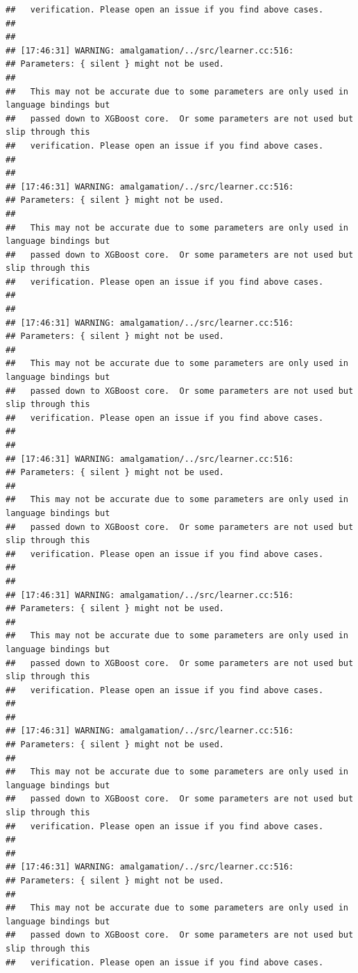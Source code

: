\documentclass[AMS,STIX2COL]{WileyNJD-v2}\usepackage[]{graphicx}\usepackage[]{color}
\makeatletter
\newenvironment{kframe}{%
 \def\at@end@of@kframe{}%
 \ifinner\ifhmode%
  \def\at@end@of@kframe{\end{minipage}}%
  \begin{minipage}{\columnwidth}%
 \fi\fi%
 \def\FrameCommand##1{\hskip\@totalleftmargin \hskip-\fboxsep
 \colorbox{shadecolor}{##1}\hskip-\fboxsep
     \hskip-\linewidth \hskip-\@totalleftmargin \hskip\columnwidth}%
 \MakeFramed {\advance\hsize-\width
   \@totalleftmargin\z@ \linewidth\hsize
   \@setminipage}}%
 {\par\unskip\endMakeFramed%
 \at@end@of@kframe}
\newenvironment{knitrout}{}{} %
\makeatother
\begin{document}
\begin{knitrout}
\begin{kframe}
\begin{verbatim}
##   verification. Please open an issue if you find above cases.
## 
## 
## [17:46:31] WARNING: amalgamation/../src/learner.cc:516: 
## Parameters: { silent } might not be used.
## 
##   This may not be accurate due to some parameters are only used in language bindings but
##   passed down to XGBoost core.  Or some parameters are not used but slip through this
##   verification. Please open an issue if you find above cases.
## 
## 
## [17:46:31] WARNING: amalgamation/../src/learner.cc:516: 
## Parameters: { silent } might not be used.
## 
##   This may not be accurate due to some parameters are only used in language bindings but
##   passed down to XGBoost core.  Or some parameters are not used but slip through this
##   verification. Please open an issue if you find above cases.
## 
## 
## [17:46:31] WARNING: amalgamation/../src/learner.cc:516: 
## Parameters: { silent } might not be used.
## 
##   This may not be accurate due to some parameters are only used in language bindings but
##   passed down to XGBoost core.  Or some parameters are not used but slip through this
##   verification. Please open an issue if you find above cases.
## 
## 
## [17:46:31] WARNING: amalgamation/../src/learner.cc:516: 
## Parameters: { silent } might not be used.
## 
##   This may not be accurate due to some parameters are only used in language bindings but
##   passed down to XGBoost core.  Or some parameters are not used but slip through this
##   verification. Please open an issue if you find above cases.
## 
## 
## [17:46:31] WARNING: amalgamation/../src/learner.cc:516: 
## Parameters: { silent } might not be used.
## 
##   This may not be accurate due to some parameters are only used in language bindings but
##   passed down to XGBoost core.  Or some parameters are not used but slip through this
##   verification. Please open an issue if you find above cases.
## 
## 
## [17:46:31] WARNING: amalgamation/../src/learner.cc:516: 
## Parameters: { silent } might not be used.
## 
##   This may not be accurate due to some parameters are only used in language bindings but
##   passed down to XGBoost core.  Or some parameters are not used but slip through this
##   verification. Please open an issue if you find above cases.
## 
## 
## [17:46:31] WARNING: amalgamation/../src/learner.cc:516: 
## Parameters: { silent } might not be used.
## 
##   This may not be accurate due to some parameters are only used in language bindings but
##   passed down to XGBoost core.  Or some parameters are not used but slip through this
##   verification. Please open an issue if you find above cases.

\end{verbatim}
\end{kframe}
\end{knitrout}
\end{document}
